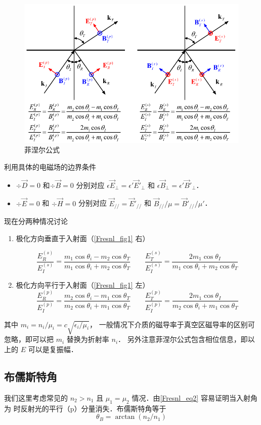  
 \begin{figure}[ht]
\centering
\includegraphics[width=14cm]{./figures/Fresnl1.pdf}
\caption{菲涅尔公式} \label{Fresnl_fig1}
\end{figure}
 
利用具体的电磁场的边界条件 %
\begin{itemize}
\item $\div \vec D = 0$ 和$\div \vec B = 0$  分别对应 $\epsilon \vec E_\bot = \epsilon' \vec E'_\bot$ 和 $\epsilon \vec B_\bot = \epsilon' \vec B'_\bot$．

\item $\div \vec E = 0$ 和 $\div \vec H = 0$ 分别对应 $\vec E_{//} = \vec E'_{//}$ 和 $\vec B_{//}/\mu = \vec B'_{//}/\mu'$．
\end{itemize}

现在分两种情况讨论
\begin{enumerate}
\item 极化方向垂直于入射面（\autoref{Fresnl_fig1} 右）

\begin{equation}
\frac{E_R^{(s)}}{E_I^{(s)}} =  \frac{m_1\cos{\theta_i} - m_2\cos\theta_T}{m_1\cos\theta_i + m_2\cos\theta_T}
\qquad
\frac{E_T^{(s)}}{E_I^{(s)}} = \frac{2 m_1\cos\theta_I}{m_1\cos\theta_i + m_2\cos\theta_T}
\end{equation}

\item 极化方向平行于入射面（\autoref{Fresnl_fig1} 左）
\begin{equation}\label{Fresnl_eq2}
\frac{E_R^{(p)}}{E_I^{(p)}} =  \frac{m_2\cos\theta_i - m_1\cos\theta_T}{m_2 \cos\theta_i + m_1\cos\theta_T}
\qquad
\frac{E_T^{(p)}}{E_I^{(p)}} =  \frac{2 m_1\cos\theta_I}{m_2\cos\theta_i + m_1\cos\theta_T}
\end{equation}
\end{enumerate}
其中 $m_i=n_i/\mu_i = c\sqrt{\epsilon_i/\mu_i}$， 一般情况下介质的磁导率于真空区磁导率的区别可忽略，即可以把 $m_i$ 替换为折射率 $n_i$． 另外注意菲涅尔公式包含相位信息，即以上的 $E$ 可以是复振幅．

\subsection{布儒斯特角}
我们这里考虑常见的 $n_2>n_1$ 且 $\mu_1 = \mu_2$ 情况．由\autoref{Fresnl_eq2} 容易证明当入射角为 时反射光的平行（p）分量消失．布儒斯特角等于
\begin{equation}
\theta_B = \arctan (n_2/n_1)
\end{equation}

